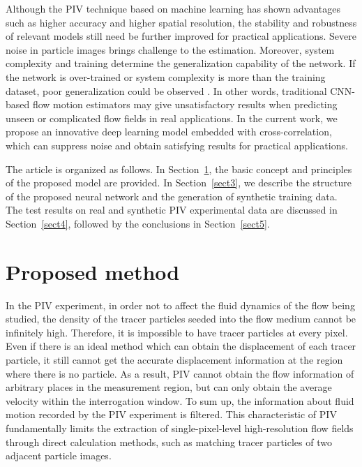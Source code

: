 \documentclass[%
 aip,
 amsmath,amssymb,
 reprint,%
]{revtex4-1}
\begin{document}
Although the PIV technique based on machine learning has shown advantages such as higher accuracy and higher spatial resolution, the stability and robustness of relevant models still need be further improved for practical applications.
Severe noise in particle images brings challenge to the estimation.
Moreover, system complexity and training determine the generalization capability of the network. 
If the network is over-trained or system complexity is more than the training dataset, poor generalization could be observed \citep{Urolagin}. In other words, traditional CNN-based flow motion estimators may give unsatisfactory results when predicting unseen or complicated flow fields in real applications.
In the current work, we propose an innovative deep learning model embedded with cross-correlation, which can suppress noise and obtain satisfying results for practical applications.

The article is organized as follows. In Section~\ref{sect2}, the basic concept and principles of the proposed model are provided.
In Section~\ref{sect3}, we describe the structure of the proposed neural network and the generation of synthetic training data. 
The test results on real and synthetic PIV experimental data are discussed in Section~\ref{sect4}, followed by the conclusions in Section~\ref{sect5}.


\section{Proposed method}
\label{sect2}
In the PIV experiment, in order not to affect the fluid dynamics of the flow being studied, the density of the tracer particles seeded into the flow medium cannot be infinitely high.
Therefore, it is impossible to have tracer particles at every pixel.
Even if there is an ideal method which can obtain the displacement of each tracer particle, it still cannot get the accurate displacement information at the region where there is no particle. 
As a result, PIV cannot obtain the flow information of arbitrary places in the measurement region, but can only obtain the average velocity within the interrogation window.
To sum up, the information about fluid motion recorded by the PIV experiment is filtered. 
This characteristic of PIV fundamentally limits the extraction of single-pixel-level high-resolution flow fields through direct calculation methods, such as matching tracer particles of two adjacent particle images.
\end{document}
